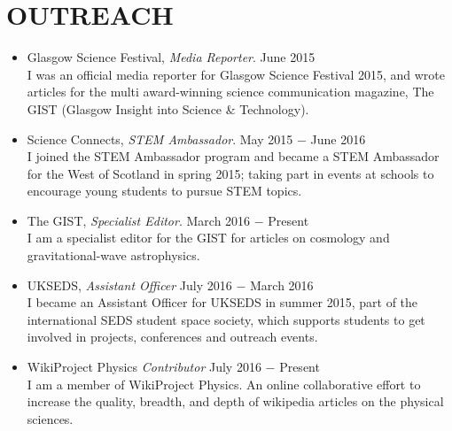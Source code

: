 
\section{OUTREACH}
\begin{itemize}
\item Glasgow Science Festival, {\sl Media Reporter}. \hfill June 2015 \\
I was an official media reporter for Glasgow Science Festival 2015, and wrote articles for the multi award-winning science communication magazine, The GIST (Glasgow Insight into Science \& Technology). \\

\item Science Connects, {\sl STEM Ambassador}. \hfill May 2015 $-$ June 2016 \\
I joined the STEM Ambassador program and became a STEM Ambassador for the West of Scotland in spring 2015; taking part in events at schools to encourage young students to pursue STEM topics. \\

\item The GIST, {\sl Specialist Editor}. \hfill March 2016 $-$ Present \\
I am a specialist editor for the GIST for articles on cosmology and gravitational-wave astrophysics. \\

\item UKSEDS, {\sl Assistant Officer} \hfill July 2016 $-$ March 2016\\
I became an Assistant Officer for UKSEDS in summer 2015, part of the international SEDS student space society, which supports students to get involved in projects, conferences and outreach events. \\

\item WikiProject Physics {\sl Contributor} \hfill July 2016 $-$ Present\\
I am a member of WikiProject Physics. An online collaborative effort to increase the quality, breadth, and depth of wikipedia articles on the physical sciences. \\

\end{itemize}

